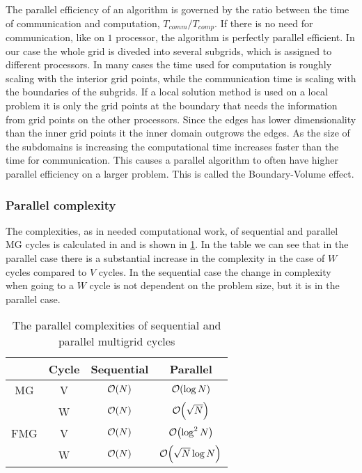 		The parallel efficiency of an algorithm is governed by the ratio between the
		time of communication and computation, \(T_{comm}/T_{comp}\). If there is no
		need for communication, like on \(1\) processor, the algorithm is perfectly
		parallel efficient. In our case the whole grid is diveded into several subgrids,
		which is assigned to different processors. In many cases the time used for
		computation is roughly scaling with the interior grid points, while the
		communication time is scaling with the boundaries of the subgrids. If a
		local solution method is used on a local problem it is only the grid points
		at the boundary that needs the information from grid points on the other
		processors. Since the edges has lower dimensionality than the inner grid
		points it the inner domain outgrows the edges. As the size of the subdomains is increasing
		the computational time increases
		faster than the time for communication. This causes a parallel algorithm to often have
		higher parallel efficiency on a larger problem. This is called the Boundary-Volume effect.

		\subsubsection{Parallel complexity}
			The complexities, as in needed computational work, of sequential and
			parallel MG cycles is calculated in \cite{hackbusch_multigrid_1982} and is
			shown in \cref{tab:parallel_complexity}. In the table we can see that in
			the parallel case there is a substantial increase in the complexity in the
			case of \(W\) cycles compared to \(V\) cycles. In the sequential case the
			change in complexity when going to a \(W\) cycle is not dependent on the
			problem size, but it is in the parallel case.


		\begin{table}
			\centering
			\begin{tabular}{ c  c c c}
				& Cycle & Sequential & Parallel
			  	\\  \hline
			  	MG & V & \(\order{N}\) & \(\order{\log N}\)
			  	\\
			  	& W & $\order{N}$ & $\order{\sqrt{N}}$
			  	\\ \hline
				FMG & V & $\order{N}$ & $\order{\log^2 N}$
				\\
				& W & $\order{N}$ & \( \order{\sqrt{N} \log{N}} \)
			\end{tabular}
			\caption{The parallel complexities of sequential and parallel multigrid cycles}
			\label{tab:parallel_complexity}
		\end{table}



